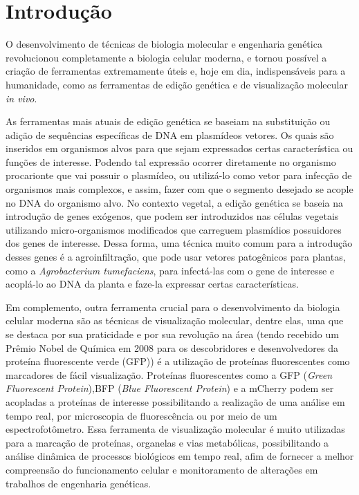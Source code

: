 \section{Introdução} 
O desenvolvimento de técnicas de biologia molecular e engenharia genética
revolucionou completamente a biologia celular moderna, e tornou possível a
criação de ferramentas extremamente úteis e, hoje em dia, indispensáveis para a
humanidade\cite{teófilo_gallão_2019}, como as ferramentas de edição genética e
de visualização molecular \textit{in vivo}.

As ferramentas mais atuais de edição genética se baseiam na substituição ou
adição de sequências específicas de DNA em plasmídeos
vetores\cite{BriefyHistoryOfGenetics}. Os quais são inseridos em organismos
alvos para que sejam expressados certas característica ou funções de interesse.
Podendo tal expressão ocorrer diretamente no organismo procarionte que vai
possuir o plasmídeo\cite{ruiz_silhavy_2022}, ou utilizá-lo como vetor para
infecção de organismos mais complexos, e assim, fazer com que o segmento
desejado se acople no DNA do organismo alvo. No contexto vegetal, a edição
genética se baseia na introdução de genes exógenos, que podem ser introduzidos
nas células vegetais utilizando micro-organismos modificados que carreguem
plasmídios possuidores dos genes de interesse\cite{embrapa2017manual}. Dessa
forma, uma técnica muito comum para a introdução desses genes é a
agroinfiltração, que pode usar vetores patogênicos para plantas, como a
\textit{Agrobacterium tumefaciens}, para infectá-las com o gene de interesse e
acoplá-lo ao DNA da planta e faze-la expressar certas
características\cite{embrapa2017manual}.

Em complemento, outra ferramenta crucial para o desenvolvimento da biologia
celular moderna são as técnicas de visualização molecular, dentre elas, uma que
se destaca por sua praticidade e por sua revolução na área (tendo recebido um
Prêmio Nobel de Química em 2008 para os descobridores e desenvolvedores da
proteína fluorescente verde (GFP)\cite{jeremy_jackson_2009}) é a utilização de
proteínas fluorescentes como marcadores de fácil visualização. Proteínas
fluorescentes como a GFP (\textit{Green Fluorescent Protein}),BFP (\textit{Blue
Fluorescent Protein}) e a mCherry podem ser acopladas a proteínas de interesse
possibilitando a realização de uma análise em tempo real, por microscopia de
fluorescência ou por meio de um espectrofotômetro.  Essa ferramenta de
visualização molecular é muito utilizadas para a marcação de proteínas,
organelas e vias metabólicas, possibilitando a análise dinâmica de processos
biológicos em tempo real, afim de fornecer a melhor compreensão do funcionamento
celular e monitoramento de alterações em trabalhos de engenharia
genéticas\cite{misteli_spector_1997}. 

